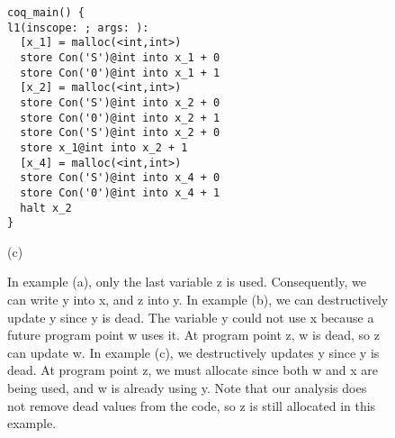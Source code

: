 \documentclass{article}
\begin{document}
\begin{figure}
\begin{minipage}[t]{.31\textwidth}
\begin{lstlisting}
coq_main() {
l1(inscope: ; args: ):
  [x_1] = malloc(<int,int>)
  store Con('S')@int into x_1 + 0
  store Con('0')@int into x_1 + 1
  [x_2] = malloc(<int,int>)
  store Con('S')@int into x_2 + 0
  store Con('0')@int into x_2 + 1
  store Con('S')@int into x_2 + 0
  store x_1@int into x_2 + 1
  [x_4] = malloc(<int,int>)
  store Con('S')@int into x_4 + 0
  store Con('0')@int into x_4 + 1
  halt x_2
}
\end{lstlisting}
\centering (c)
\end{minipage}
\caption{In example (a), only the last variable z is used. Consequently, we can write y into x, and z into y. In example (b), we can destructively update y since y is dead. The variable y could not use x because a future program point w uses it. At program point z, w is dead, so z can update w. In example (c), we destructively updates y since y is dead. At program point z, we must allocate since both w and x are being used, and w is already using y. Note that our analysis does not remove dead values from the code, so z is still allocated in this example. }
\label{fig:dupdate}
\end{figure}
\end{document}
